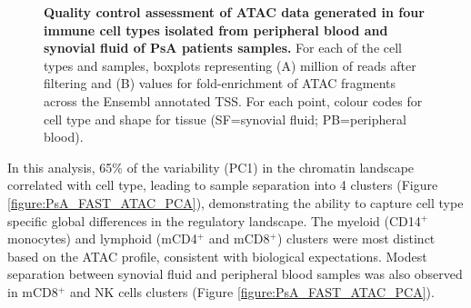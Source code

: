 \begin{figure}[H]
\begin{subfigure}[b]{0.48\textwidth}
\caption{}
\end{subfigure}
\caption[Quality control assessment of ATAC data generated in four immune cell types isolated from peripheral blood and synovial fluid of PsA patients samples.]{\textbf{Quality control assessment of ATAC data generated in four immune cell types isolated from peripheral blood and synovial fluid of PsA patients samples.} For each of the cell types and samples, boxplots representing (A) million of reads after filtering and (B) values for fold-enrichment of ATAC fragments across the Ensembl annotated TSS. For each point, colour codes for cell type and shape for tissue (SF=synovial fluid; PB=peripheral blood).}
\label{figure:PsA_FAST_ATAC_QC}
\end{figure}



In this analysis, 65\% of the variability (PC1) in the chromatin landscape correlated with cell type, leading to sample separation into 4 clusters (Figure \ref{figure:PsA_FAST_ATAC_PCA}), demonstrating the ability to capture cell type specific global differences in the regulatory landscape. The myeloid (CD14$^+$ monocytes) and lymphoid (mCD4$^+$ and mCD8$^+$) clusters were most distinct based on the ATAC profile, consistent with biological expectations. Modest separation between synovial fluid and peripheral blood samples was also observed in mCD8$^+$ and NK cells clusters (Figure \ref{figure:PsA_FAST_ATAC_PCA}).



